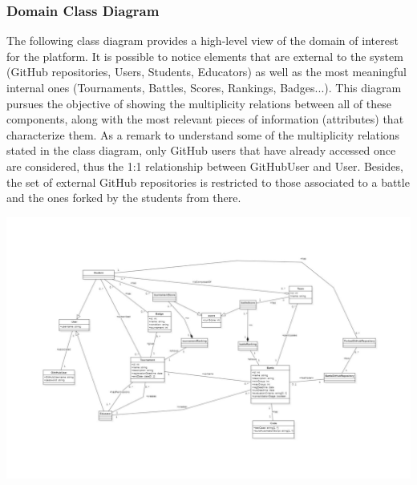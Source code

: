 
\begin{minipage}{\linewidth}
\subsubsection{Domain Class Diagram}

The following class diagram provides a high-level view of the domain of interest for the \app platform. It is possible to notice elements that are external to the system (GitHub repositories, Users, Students, Educators) as well as the most meaningful internal ones (Tournaments, Battles, Scores, Rankings, Badges...). 
This diagram pursues the objective of showing the multiplicity relations between all of these components, along with the most relevant pieces of information (attributes) that characterize them.
As a remark to understand some of the multiplicity relations stated in the class diagram, only GitHub users that have already accessed \app once are considered, thus the 1:1 relationship between GitHubUser and User. Besides, the set of external GitHub repositories is restricted to those associated to a battle and the ones forked by the students from there.
\begin{center}
\includegraphics[angle=90,width=0.85\linewidth]{2Overall_Description/res/ClassDiagram}
\end{center}

\end{minipage}
